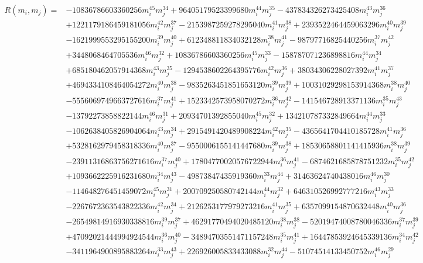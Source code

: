 {\small
\begin{align*}
R(m_i,m_j)={}&-10836786603360256m_i^{45}m_j^{34}+96405179523399680m_i^{44}m_j^{35}-437834326273425408m_i^{43}m_j^{36}\\
&+1221179186459181056m_i^{42}m_j^{37}-2153987259278295040m_i^{41}m_j^{38}+2393522464459063296m_i^{40}m_j^{39}\\
&-1621999553295155200m_i^{39}m_j^{40}+612348811834032128m_i^{38}m_j^{41}-98797716825440256m_i^{37}m_j^{42}\\
&+3448068464705536m_i^{46}m_j^{32}+10836786603360256m_i^{45}m_j^{33}-158787071236898816m_i^{44}m_j^{34}\\
&+685180462057914368m_i^{43}m_j^{35}-1294538602264395776m_i^{42}m_j^{36}+38034306228027392m_i^{41}m_j^{37}\\
&+4694334108464054272m_i^{40}m_j^{38}-9835263451851653120m_i^{39}m_j^{39}+10031029298153914368m_i^{38}m_j^{40}\\
&-5556069749663727616m_i^{37}m_j^{41}+1523342573958070272m_i^{36}m_j^{42}-141546728913371136m_i^{35}m_j^{43}\\
&-13792273858822144m_i^{46}m_j^{31}+20934701392855040m_i^{45}m_j^{32}+134210787332849664m_i^{44}m_j^{33}\\
&-1062638405826904064m_i^{43}m_j^{34}+2915491420489908224m_i^{42}m_j^{35}-4365641704410185728m_i^{41}m_j^{36}\\
&+5328162979458318336m_i^{40}m_j^{37}-9550006155141447680m_i^{39}m_j^{38}+18530658801141415936m_i^{38}m_j^{39}\\
&-23911316863756271616m_i^{37}m_j^{40}+17804770020576722944m_i^{36}m_j^{41}-6874621685878751232m_i^{35}m_j^{42}\\
&+1093662225916231680m_i^{34}m_j^{43}-49873847435919360m_i^{33}m_j^{44}+31463624740438016m_i^{46}m_j^{30}\\
&-114648276451459072m_i^{45}m_j^{31}+200709250580742144m_i^{44}m_j^{32}+646310526992777216m_i^{43}m_j^{33}\\
&-2267672363543822336m_i^{42}m_j^{34}+2126253177979273216m_i^{41}m_j^{35}+6357099154870632448m_i^{40}m_j^{36}\\
&-26549814916930338816m_i^{39}m_j^{37}+46291770494020485120m_i^{38}m_j^{38}-52019474008780046336m_i^{37}m_j^{39}\\
&+47092021444994924544m_i^{36}m_j^{40}-34894703551471157248m_i^{35}m_j^{41}+16447853924645339136m_i^{34}m_j^{42}\\
&-3411964900895883264m_i^{33}m_j^{43}+226926005833433088m_i^{32}m_j^{44}-51074514133450752m_i^{46}m_j^{29}\\

\end{align*}}

